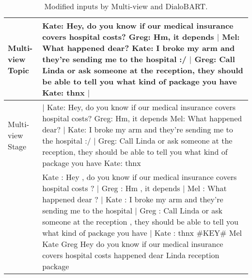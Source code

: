 \begin{table}[h]
	\small
	\centering
	\begin{tabular}{lp{5cm}}
		\toprule[1pt]
		\makecell[l]{{Multi-view}\\ {Topic}}& Kate: Hey, do you know if our medical insurance covers hospital costs? Greg: Hm, it depends $\mid$ Mel: What happened dear? Kate: I broke my arm and they're sending me to the hospital :/ $\mid$ Greg: Call Linda or ask someone at the reception, they should be able to tell you what kind of package you have Kate: thnx $\mid$
		\\
		
		\hline
		\makecell[l]{{Multi-view}\\ {Stage}} & $\mid$ Kate: Hey, do you know if our medical insurance covers hospital costs? Greg: Hm, it depends Mel: What happened dear? $\mid$ Kate: I broke my arm and they're sending me to the hospital :/ $\mid$ Greg: Call Linda or ask someone at the reception, they should be able to tell you what kind of package you have Kate: thnx
		\\
		
		\hline
		\makecell[l]{{DialoBART}} & Kate : Hey , do you know if our medical insurance covers hospital costs ? $\mid$ Greg : Hm , it depends $\mid$ Mel : What happened dear ? $\mid$ Kate : I broke my arm and they're sending me to the hospital $\mid$ Greg : Call Linda or ask someone at the reception , they should be able to tell you what kind of package you have $\mid$ Kate : thnx \#KEY\# Mel Kate Greg Hey do you know if our medical insurance covers hospital costs happened dear Linda reception package\\
		
		\bottomrule[1pt]
	\end{tabular}
	\caption{Modified inputs by Multi-view and DialoBART.}
	\label{tab:case1inputs}
\end{table}

